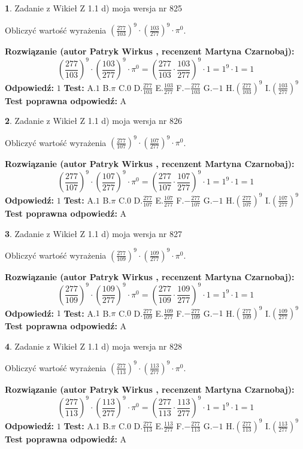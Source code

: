 \documentclass[12pt, a4paper]{article}
\theoremstyle{definition} %
\newtheorem{zad}{}
\newcommand{\zadStart}[1]{\begin{zad}#1\newline}
\newcommand{\zadStop}{\end{zad}}
\newcommand{\rozwStart}[2]{\noindent \textbf{Rozwiązanie (autor #1 , recenzent #2): }\newline}
\newcommand{\rozwStop}{\newline}
\newcommand{\odpStart}{\noindent \textbf{Odpowiedź:}\newline}
\newcommand{\odpStop}{\newline}
\newcommand{\testStart}{\noindent \textbf{Test:}\newline}
\newcommand{\testStop}{\newline}
\newcommand{\kluczStart}{\noindent \textbf{Test poprawna odpowiedź:}\newline}
\newcommand{\kluczStop}{\newline}
\begin{document}
\zadStart{Zadanie z Wikieł Z 1.1 d) moja wersja nr 825}

Obliczyć wartość wyrażenia $(\frac{277}{103})^{9} \cdot (\frac{103}{277})^{9} \cdot \pi^{0}$.
\zadStop
\rozwStart{Patryk Wirkus}{Martyna Czarnobaj}
$$(\frac{277}{103})^{9} \cdot (\frac{103}{277})^{9} \cdot \pi^{0} = (\frac{277}{103} \cdot \frac{103}{277})^{9} \cdot 1 = 1^{9} \cdot 1 = 1$$
\rozwStop
\odpStart
$1$
\odpStop
\testStart
A.$1$ B.$\pi$ C.$0$ D.$\frac{277}{103}$ E.$\frac{103}{277}$
F.$-\frac{277}{103}$ G.$-1$
H.$(\frac{277}{103})^{9}$
I.$(\frac{103}{277})^{9}$
\testStop
\kluczStart
A
\kluczStop



\zadStart{Zadanie z Wikieł Z 1.1 d) moja wersja nr 826}

Obliczyć wartość wyrażenia $(\frac{277}{107})^{9} \cdot (\frac{107}{277})^{9} \cdot \pi^{0}$.
\zadStop
\rozwStart{Patryk Wirkus}{Martyna Czarnobaj}
$$(\frac{277}{107})^{9} \cdot (\frac{107}{277})^{9} \cdot \pi^{0} = (\frac{277}{107} \cdot \frac{107}{277})^{9} \cdot 1 = 1^{9} \cdot 1 = 1$$
\rozwStop
\odpStart
$1$
\odpStop
\testStart
A.$1$ B.$\pi$ C.$0$ D.$\frac{277}{107}$ E.$\frac{107}{277}$
F.$-\frac{277}{107}$ G.$-1$
H.$(\frac{277}{107})^{9}$
I.$(\frac{107}{277})^{9}$
\testStop
\kluczStart
A
\kluczStop



\zadStart{Zadanie z Wikieł Z 1.1 d) moja wersja nr 827}

Obliczyć wartość wyrażenia $(\frac{277}{109})^{9} \cdot (\frac{109}{277})^{9} \cdot \pi^{0}$.
\zadStop
\rozwStart{Patryk Wirkus}{Martyna Czarnobaj}
$$(\frac{277}{109})^{9} \cdot (\frac{109}{277})^{9} \cdot \pi^{0} = (\frac{277}{109} \cdot \frac{109}{277})^{9} \cdot 1 = 1^{9} \cdot 1 = 1$$
\rozwStop
\odpStart
$1$
\odpStop
\testStart
A.$1$ B.$\pi$ C.$0$ D.$\frac{277}{109}$ E.$\frac{109}{277}$
F.$-\frac{277}{109}$ G.$-1$
H.$(\frac{277}{109})^{9}$
I.$(\frac{109}{277})^{9}$
\testStop
\kluczStart
A
\kluczStop



\zadStart{Zadanie z Wikieł Z 1.1 d) moja wersja nr 828}

Obliczyć wartość wyrażenia $(\frac{277}{113})^{9} \cdot (\frac{113}{277})^{9} \cdot \pi^{0}$.
\zadStop
\rozwStart{Patryk Wirkus}{Martyna Czarnobaj}
$$(\frac{277}{113})^{9} \cdot (\frac{113}{277})^{9} \cdot \pi^{0} = (\frac{277}{113} \cdot \frac{113}{277})^{9} \cdot 1 = 1^{9} \cdot 1 = 1$$
\rozwStop
\odpStart
$1$
\odpStop
\testStart
A.$1$ B.$\pi$ C.$0$ D.$\frac{277}{113}$ E.$\frac{113}{277}$
F.$-\frac{277}{113}$ G.$-1$
H.$(\frac{277}{113})^{9}$
I.$(\frac{113}{277})^{9}$
\testStop
\kluczStart
A
\kluczStop
\end{document}
